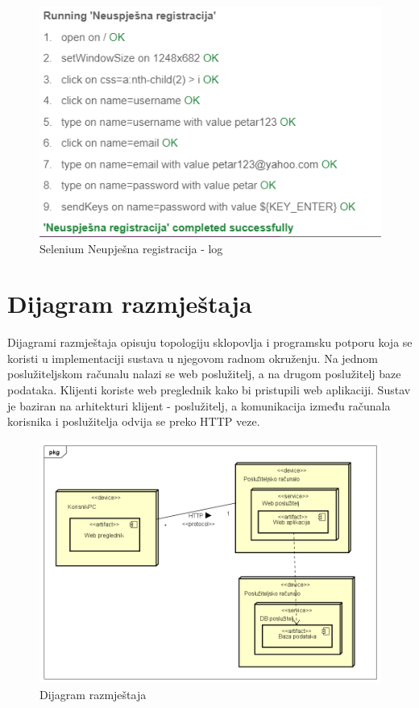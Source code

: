 \begin{figure}[H]
			\includegraphics[scale=0.8]{slike/NeuspjesnaRegistracija1.png}
			\centering
			\caption{Selenium Neupješna registracija - log}
			\label{fig:promjene}
		          \end{figure}
    
			
			\eject 
		
		
		\section{Dijagram razmještaja}


            Dijagrami razmještaja opisuju topologiju sklopovlja i programsku potporu koja se koristi u implementaciji sustava  u njegovom radnom okruženju. Na jednom poslužiteljskom računalu nalazi se web poslužitelj, a na drugom poslužitelj baze podataka. Klijenti koriste web preglednik kako bi pristupili web aplikaciji. Sustav je baziran na arhitekturi klijent - poslužitelj, a komunikacija između računala korisnika i poslužitelja odvija se preko HTTP veze. 
            
			\begin{figure}[H]
			\includegraphics[scale=0.7]{slike/DijagramRazmjestaja.png}
			\centering
			\caption{Dijagram razmještaja}
			\label{fig:promjene}
				\end{figure}
			
